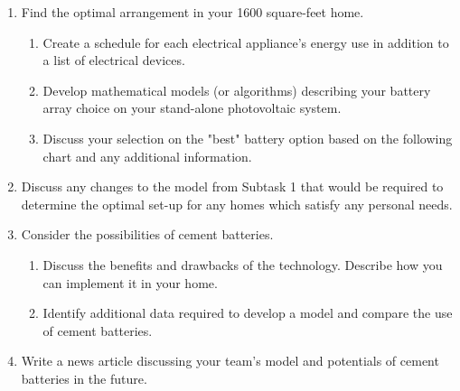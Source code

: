 \begin{enumerate}

\item Find the optimal arrangement in your 1600 square-feet home.

\begin{enumerate}
    \item Create a schedule for each electrical appliance's energy use in addition to a list of electrical devices.
    \item Develop mathematical models (or algorithms) describing your battery array choice on your stand-alone photovoltaic system.
    \item Discuss your selection on the "best" battery option based on the following chart and any additional information.
\end{enumerate}

\item Discuss any changes to the model from Subtask 1 that would be required to determine the optimal set-up for any homes which satisfy any personal needs.
\item Consider the possibilities of cement batteries.

\begin{enumerate}
    \item Discuss the benefits and drawbacks of the technology. Describe how you can implement it in your home.
    \item Identify additional data required to develop a model and compare the use of cement batteries.
\end{enumerate}

\item Write a news article discussing your team's model and potentials of cement batteries in the future.

\end{enumerate}
